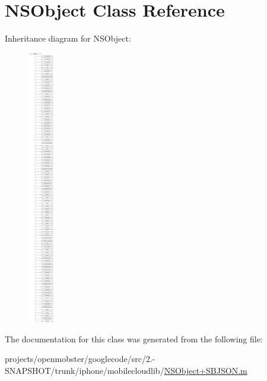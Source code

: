 \hypertarget{class_n_s_object}{
\section{\-N\-S\-Object \-Class \-Reference}
\label{class_n_s_object}
}
\-Inheritance diagram for \-N\-S\-Object\-:\begin{figure}[H]
\begin{center}
\leavevmode
\includegraphics[height=12.000000cm]{class_n_s_object}
\end{center}
\end{figure}


\-The documentation for this class was generated from the following file\-:\begin{DoxyCompactItemize}
\item 
projects/openmobster/googlecode/src/2.-\/\-S\-N\-A\-P\-S\-H\-O\-T/trunk/iphone/mobilecloudlib/\hyperlink{_n_s_object_09_s_b_j_s_o_n_8m}{\-N\-S\-Object+\-S\-B\-J\-S\-O\-N.\-m}\end{DoxyCompactItemize}
